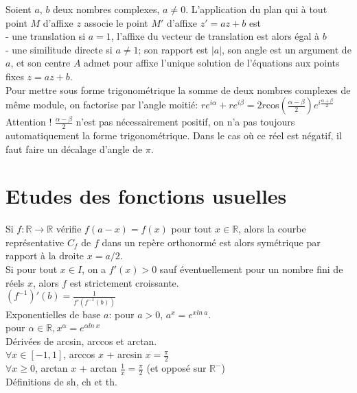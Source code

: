 \documentclass{article}
\begin{document}
		Soient $a$, $b$ deux nombres complexes, $a \neq 0$. L'application du plan qui à tout point $M$ d'affixe $z$ associe le point $M'$ d'affixe $z' = az + b$ est\\
		- une translation si $a = 1$, l'affixe du vecteur de translation est alors égal à $b$\\
		- une similitude directe si $a \neq 1$; son rapport est $|a|$, son angle est un argument de $a$, et son centre $A$ admet pour affixe l'unique solution de l'équations aux points fixes $z = az + b$.\\
		
		Pour mettre sous forme trigonométrique la somme de deux nombres complexes de même module, on factorise par l'angle moitié: $re^{i\alpha} + re^{i\beta} = 2r$cos$\left(\frac{\alpha-\beta}{2}\right)e^{i\frac{\alpha + \beta}{2}}$\\
		Attention ! $\frac{\alpha-\beta}{2}$ n'est pas nécessairement positif, on n'a pas toujours automatiquement la forme trigonométrique. Dans le cas où ce réel est négatif, il faut faire un décalage d'angle de $\pi$.

	\section{Etudes des fonctions usuelles}
	
		Si $f:\mathbb{R} \rightarrow \mathbb{R}$ vérifie $f(a-x) = f(x)$ pour tout $x \in \mathbb{R}$, alors la courbe représentative $C_f$ de $f$ dans un repère orthonormé est alors symétrique par rapport à la droite $x = a/2$.\\
		
		Si pour tout $x \in I$, on a $f'(x) > 0$ sauf éventuellement pour un nombre fini de réels $x$, alors $f$ est strictement croissante.\\
		
		$(f^{-1})'(b)=\frac{1}{f'(f^{-1}(b))}$\\
		
		Exponentielles de base $a$: pour $a > 0$, $a^x=e^{xln\ a}$.\\
		pour $\alpha \in \mathbb{R}, x^\alpha=e^{\alpha ln\ x}$\\
		
		Dérivées de arcsin, arccos et arctan.\\
		$\forall x \in [-1, 1]$, arccos $x$ + arcsin $x = \frac{\pi}{2}$\\
		$\forall x \geq 0$, arctan $x$ + arctan $\frac{1}{x} = \frac{\pi}{2}$ (et opposé sur $\mathbb{R}^-$)\\
		Définitions de sh, ch et th.
\end{document}
